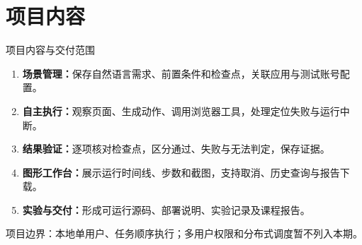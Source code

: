 \section{项目内容}
\begin{frame}{项目内容与交付范围}
\begin{enumerate}
\item \textbf{场景管理：}保存自然语言需求、前置条件和检查点，关联应用与测试账号配置。
\item \textbf{自主执行：}观察页面、生成动作、调用浏览器工具，处理定位失败与运行中断。
\item \textbf{结果验证：}逐项核对检查点，区分通过、失败与无法判定，保存证据。
\item \textbf{图形工作台：}展示运行时间线、步数和截图，支持取消、历史查询与报告下载。
\item \textbf{实验与交付：}形成可运行源码、部署说明、实验记录及课程报告。
\end{enumerate}
\vfill
\small 项目边界：本地单用户、任务顺序执行；多用户权限和分布式调度暂不列入本期。
\end{frame}
